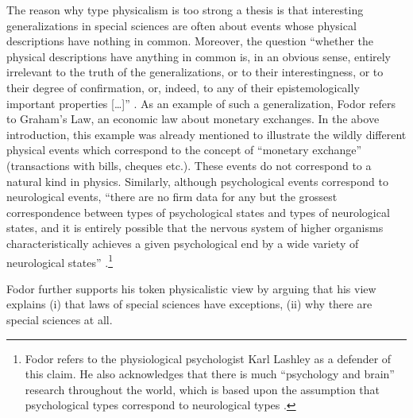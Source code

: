 \documentclass[output=paper]{langscibook}
\begin{document}
\largerpage[1]The reason why type physicalism is too strong a thesis is that interesting generalizations in special sciences are often about events whose physical descriptions have nothing in common. Moreover, the question ``whether the physical descriptions have anything in common is, in an obvious sense, entirely irrelevant to the truth of the generalizations, or to their interestingness, or to their degree of confirmation, or, indeed, to any of their epistemologically important properties […]'' \citep[103]{Fodor1974}. As an example of such a generalization, Fodor refers to Graham's Law, an economic law about monetary exchanges. In the above introduction, this example was already mentioned to illustrate the wildly different physical events which correspond to the concept of ``monetary exchange'' (transactions with bills, cheques etc.). These events do not correspond to a natural kind in physics. Similarly, although psychological events correspond to neurological events, ``there are no firm data for any but the grossest correspondence between types of psychological states and types of neurological states, and it is entirely possible that the nervous system of higher organisms characteristically achieves a given psychological end by a wide variety of neurological states'' \citep[105]{Fodor1974}.\footnote{Fodor refers to the physiological psychologist Karl Lashley as a defender of this claim. He also acknowledges that there is much ``psychology and brain'' research throughout the world, which is based upon the assumption that psychological types correspond to neurological types \citep[105]{Fodor1974}.\label{fn:elffers:physpsych}}

Fodor further supports his token physicalistic view by arguing that his view explains (i) that laws of special sciences have exceptions, (ii) why there are special sciences at all.
\end{document}
